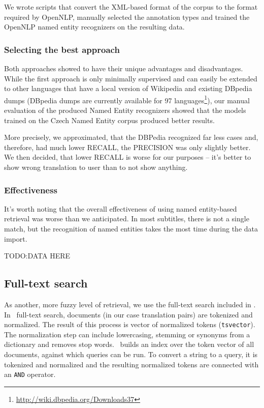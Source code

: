 We wrote scripts that convert the XML-based format of the corpus to the format required by OpenNLP, 
manually selected the annotation types and trained the OpenNLP named entity recognizers on the resulting data.


\subsubsection*{Selecting the best approach}

Both approaches showed to have their unique advantages and disadvantages. While the first approach is 
only minimally supervised and can easily be extended to other languages that have a local version of 
Wikipedia and existing DBpedia dumps (DBpedia dumps are currently available for 97 languages\footnote{\url{http://wiki.dbpedia.org/Downloads37}}), 
our manual evaluation of the produced Named Entity recognizers showed that the 
models trained on the Czech Named Entity corpus produced better results.

More precisely, we approximated, that the DBPedia recognized far less cases and, therefore, had much lower RECALL, the PRECISION was only slightly better. We then decided, that lower RECALL is worse for our purposes -- it's better to show wrong translation to user than to not show anything.

\subsubsection*{Effectiveness}
It's worth noting that the overall effectiveness of using named entity-based retrieval was worse than we anticipated. In most subtitles, there is not a single match, but the recognition of named entities takes the most time during the data import.  

TODO:DATA HERE


\subsection{Full-text search}

As another, more fuzzy level of retrieval, we use the full-text search included in \postgres. In  \postgres~full-text search, documents (in our case translation pairs) are tokenized and normalized. The result of this process is vector of normalized tokens ({\tt tsvector}). The normalization step can include lowercasing, stemming or synonyms from a dictionary and removes stop words. \postgres~builds an index over the token vector of all documents, against which queries can be run. To convert a string to a query, it is tokenized and normalized and the resulting normalized tokens are connected with an {\tt AND} operator.

